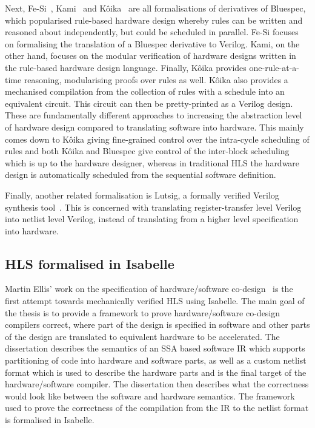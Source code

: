 Next, Fe-Si~\cite{braibant13_formal_verif_hardw_synth}, Kami~\cite{choi17_kami}
and Kôika~\cite[]{bourgeat20_essen_blues} are all formalisations of derivatives
of Bluespec, which popularised rule-based hardware design whereby rules can be
written and reasoned about independently, but could be scheduled in parallel.
Fe-Si focuses on formalising the translation of a Bluespec derivative to
Verilog.  Kami, on the other hand, focuses on the modular verification of
hardware designs written in the rule-based hardware design language.  Finally,
Kôika provides one-rule-at-a-time reasoning, modularising proofs over rules as
well.  Kôika also provides a mechanised compilation from the collection of rules
with a schedule into an equivalent circuit.  This circuit can then be
pretty-printed as a Verilog design.  These are fundamentally different
approaches to increasing the abstraction level of hardware design compared to
translating software into hardware.  This mainly comes down to Kôika giving
fine-grained control over the intra-cycle scheduling of rules and both Kôika and
Bluespec give control of the inter-block scheduling which is up to the hardware
designer, whereas in traditional \gls{HLS} the hardware design is automatically
scheduled from the sequential software definition.

Finally, another related formalisation is Lutsig, a formally verified Verilog
synthesis tool~\cite[]{lööw21_lutsig}.  This is concerned with translating
register-transfer level Verilog into netlist level Verilog, instead of
translating from a higher level specification into hardware.

\subsection{HLS formalised in Isabelle}

Martin Ellis' work on the specification of hardware/software
co-design~\cite{ellis08_csicgfu} is the first attempt towards mechanically
verified \gls{HLS} using Isabelle.  The main goal of the thesis is to provide a
framework to prove hardware/software co-design compilers correct, where part of
the design is specified in software and other parts of the design are translated
to equivalent hardware to be accelerated.  The dissertation describes the
semantics of an \gls{SSA} based software \gls{IR} which supports partitioning of
code into hardware and software parts, as well as a custom netlist format which
is used to describe the hardware parts and is the final target of the
hardware/software compiler.  The dissertation then describes what the
correctness would look like between the software and hardware semantics. The
framework used to prove the correctness of the compilation from the IR to the
netlist format is formalised in Isabelle.

